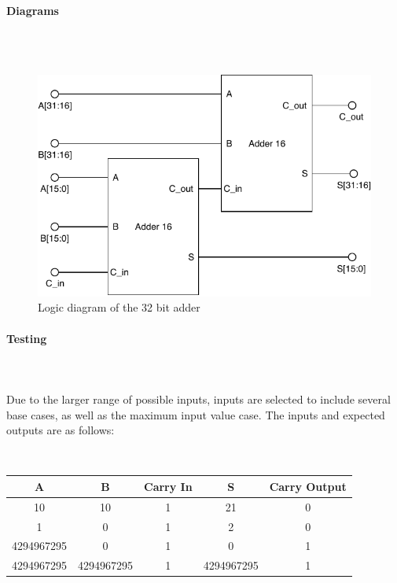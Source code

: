 \documentclass{article}
\begin{document}
    \paragraph{Diagrams}
    \hfill\\\\
    \begin{figure}[H]
        \centering
        \includegraphics{../diagrams/alu/adder/adder_32.pdf}
        \caption{Logic diagram of the 32 bit adder}
    \end{figure}

    \paragraph{Testing}
    \hfill\\\\
    Due to the larger range of possible inputs, inputs are selected to include
    several base cases, as well as the maximum input value case. The inputs
    and expected outputs are as follows:

    \hfill\\
    \begin{tabular}{|c|c|c||c|c|}
        \hline
        A & B & Carry In & S & Carry Output
        \\\hline\hline
        10 & 10 & 1 & 21 & 0
        \\\hline
        1 & 0 & 1 & 2 & 0
        \\\hline
        4294967295 & 0 & 1 & 0 & 1
        \\\hline
        4294967295 & 4294967295 & 1 & 4294967295 & 1
        \\\hline
    \end{tabular}
\end{document}

